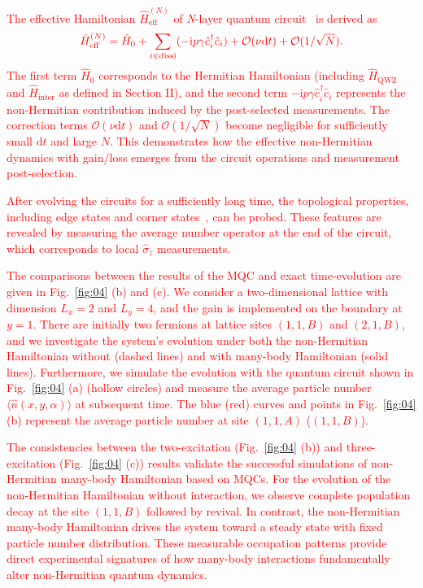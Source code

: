 \documentclass[longbibliography, aps, prx, amsmath, amssymb, amsfonts, twocolumn,superscriptaddress, footinbib]{revtex4-1}
\begin{document}
	\textcolor{red}{The effective Hamiltonian $\hat{H}_{\text{eff}}^{(N)}$ of \textit{N}-layer quantum circuit~\cite{fleckenstein2022non} is derived as}
	\begin{equation}
		\textcolor{red}{\hat{H}^{(N)}_{\text{eff}} = \hat{H}_0 + \sum_{i\in \text{dissi} } (-\mathrm{i} p\gamma \hat{c}_i^{\dagger} \hat{c}_i) + \mathcal{O}(\nu\mathrm{d} t) + \mathcal{O}(1/\sqrt{N}).\label{eq:H_scheme_new}}
	\end{equation}
	\textcolor{red}{The first term $\hat{H}_0$ corresponds to the Hermitian Hamiltonian (including $\hat{H}_{\text{QWZ}}$ and $\hat{H}_{\text{inter}}$ as defined in Section II), and the second term $-\mathrm{i} p\gamma \hat{c}_i^{\dagger} \hat{c}_i$ represents the non-Hermitian contribution induced by the post-selected measurements. The correction terms $\mathcal{O}(\nu\mathrm{d} t)$ and $\mathcal{O}(1/\sqrt{N})$ become negligible for sufficiently small $\mathrm{d}t$ and large $N$. This demonstrates how the effective non-Hermitian dynamics with gain/loss emerges from the circuit operations and measurement post-selection.}
	
	\textcolor{red}{After evolving the circuits for a sufficiently long time, the topological properties, including edge states and corner states~\cite{zou2021observation,shen2025observation}, can be probed. These features are revealed by measuring the average number operator at the end of the circuit, which corresponds to local $\hat{\sigma}_z$ measurements.}
	
	\textcolor{red}{The comparisons between the results of the MQC and exact time-evolution are given in Fig.~\ref{fig:04} (b) and (c). We consider a two-dimensional lattice with dimension $L_x=2$ and $L_y=4$, and the gain is implemented on the boundary at $y=1$. There are initially two fermions at lattice sites $(1,1,B)$ and $(2,1,B)$, and we investigate the system's evolution under both the non-Hermitian Hamiltonian without (dashed lines) and with many-body Hamiltonian (solid lines). Furthermore, we simulate the evolution with the quantum circuit shown in Fig.~\ref{fig:04} (a) (hollow circles) and measure the average particle number $\langle \hat{n}(x,y,\alpha)\rangle$ at subsequent time. The blue (red) curves and points in Fig.~\ref{fig:04} (b) represent the average particle number at site $(1,1,A)$ ($(1,1,B)$).}
	
	\textcolor{red}{The consistencies between the two-excitation (Fig.~\ref{fig:04} (b)) and three-excitation (Fig.~\ref{fig:04} (c)) results validate the successful simulations of non-Hermitian many-body Hamiltonian based on MQCs. For the evolution of the non-Hermitian Hamiltonian without interaction, we observe complete population decay at the site $(1,1,B)$ followed by revival. In contrast, the non-Hermitian many-body Hamiltonian drives the system toward a steady state with fixed particle number distribution. These measurable occupation patterns provide direct experimental signatures of how many-body interactions fundamentally alter non-Hermitian quantum dynamics.}
\end{document}

